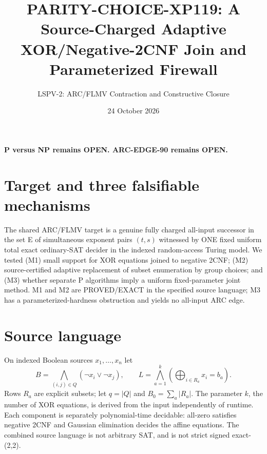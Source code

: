 \documentclass[11pt]{article}
\title{PARITY-CHOICE-XP119: A Source-Charged Adaptive XOR/Negative-2CNF Join and Parameterized Firewall}
\author{LSPV-2: ARC/FLMV Contraction and Constructive Closure}
\date{24 October 2026}
\begin{document}
\maketitle
\begin{center}\textbf{P versus NP remains OPEN. ARC-EDGE-90 remains OPEN.}\end{center}

\section{Target and three falsifiable mechanisms}
The shared ARC/FLMV target is a genuine fully charged all-input successor in the set E of simultaneous exponent pairs $(t,s)$ witnessed by ONE fixed uniform total exact ordinary-SAT decider in the indexed random-access Turing model. We tested (M1) small support for XOR equations joined to negative 2CNF; (M2) source-certified adaptive replacement of subset enumeration by group choices; and (M3) whether separate P algorithms imply a uniform fixed-parameter joint method. M1 and M2 are PROVED/EXACT in the specified source language; M3 has a parameterized-hardness obstruction and yields no all-input ARC edge.

\section{Source language}
On indexed Boolean sources $x_1,\ldots,x_n$ let
\[
B=\bigwedge_{(i,j)\in Q}(\neg x_i\vee\neg x_j),\qquad
L=\bigwedge_{a=1}^k\left(\bigoplus_{i\in R_a}x_i=b_a\right).
\]
Rows $R_a$ are explicit subsets; let $q=|Q|$ and $B_0=\sum_a|R_a|$. The parameter $k$, the number of XOR equations, is derived from the input independently of runtime. Each component is separately polynomial-time decidable: all-zero satisfies negative 2CNF and Gaussian elimination decides the affine equations. The combined source language is not arbitrary SAT, and is not strict signed exact-(2,2).
\end{document}
